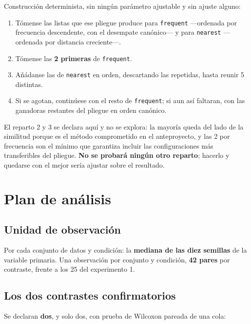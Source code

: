 \documentclass[11pt,letterpaper]{article}
\begin{document}
Construcción determinista, sin ningún parámetro ajustable y sin ajuste alguno:

\begin{enumerate}
  \item Tómense las listas que ese pliegue produce para \texttt{frequent} ---ordenada
        por frecuencia descendente, con el desempate canónico--- y para
        \texttt{nearest} ---ordenada por distancia creciente---.
  \item Tómense las \textbf{2 primeras} de \texttt{frequent}.
  \item Añádanse las de \texttt{nearest} en orden, descartando las repetidas, hasta
        reunir 5 distintas.
  \item Si se agotan, continúese con el resto de \texttt{frequent}; si aun así
        faltaran, con las ganadoras restantes del pliegue en orden canónico.
\end{enumerate}

El reparto 2 y 3 se declara aquí y no se explora: la mayoría queda del lado de la
similitud porque es el método comprometido en el anteproyecto, y las 2 por frecuencia
son el mínimo que garantiza incluir las configuraciones más transferibles del
pliegue. \textbf{No se probará ningún otro reparto}; hacerlo y quedarse con el mejor
sería ajustar sobre el resultado.

\section{Plan de análisis}
\label{sec:analisis}

\subsection{Unidad de observación}

Por cada conjunto de datos y condición: la \textbf{mediana de las diez semillas} de la
variable primaria. Una observación por conjunto y condición, \textbf{42 pares} por
contraste, frente a los 25 del experimento 1.

\subsection{Los dos contrastes confirmatorios}

Se declaran \textbf{dos}, y solo dos, con prueba de Wilcoxon pareada de una cola:
\end{document}
